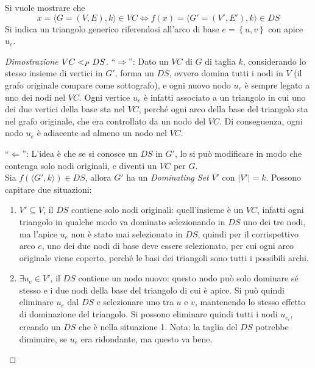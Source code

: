 Si vuole mostrare che
\begin{equation*}
    x =
    \langle
    G = \left( V,E \right), k
    \rangle
    \in VC
    \Leftrightarrow
    f(x) = 
    \langle
    G' = \left( V',E' \right), k
    \rangle
    \in DS
\end{equation*}
Si indica un triangolo generico riferendosi all'arco di base $e = \left\{ u,v \right\}$ con apice $u_e$.
\begin{proof}[Dimostrazione $VC <_P DS$]
    ``$\Rightarrow$'':
    Dato un $VC$ di $G$ di taglia $k$, considerando lo stesso insieme di vertici in $G'$, forma un $DS$, ovvero domina tutti i nodi in $V$ (il grafo originale compare come sottografo), e ogni nuovo nodo $u_e$ è sempre legato a uno dei nodi nel $VC$.
    Ogni vertice $u_e$ è infatti associato a un triangolo in cui uno dei due vertici della base sta nel $VC$, perché ogni arco della base del triangolo sta nel grafo originale, che era controllato da un nodo del $VC$. Di conseguenza, ogni nodo $u_e$ è adiacente ad almeno un nodo nel $VC$.

    ``$\Leftarrow$'':
    L'idea è che se si conosce un $DS$ in $G'$, lo si può modificare in modo che contenga solo nodi originali, e diventi un $VC$ per $G$.
    \\
    Sia $
        f(
        \langle
        G', k
        \rangle
        ) 
        \in DS
    $, allora $G'$ ha un \emph{Dominating Set} $V'$ con $|V'|=k$.
    Possono capitare due situazioni:
    \begin{enumerate}
        \item $V' \subseteq V$, il $DS$ contiene solo nodi originali: quell'insieme è un $VC$, infatti ogni triangolo in qualche modo va dominato selezionando in $DS$ uno dei tre nodi, ma l'apice $u_e$ non è stato mai selezionato in $DS$, quindi per il corrispettivo arco $e$, uno dei due nodi di base deve essere selezionato, per cui ogni arco originale viene coperto, perché le basi dei triangoli sono tutti i possibili archi.
        \item $\exists u_e \in V'$, il $DS$ contiene un nodo nuovo: questo nodo può solo dominare sé stesso e i due nodi della base del triangolo di cui è apice. Si può quindi eliminare $u_e$ dal $DS$ e selezionare uno tra $u$ e $v$, mantenendo lo stesso effetto di dominazione del triangolo. Si possono eliminare quindi tutti i nodi $u_{e_i}$, creando un $DS$ che è nella situazione 1.
            Nota: la taglia del $DS$ potrebbe diminuire, se $u_e$ era ridondante, ma questo va bene.
    \end{enumerate}
\end{proof}

